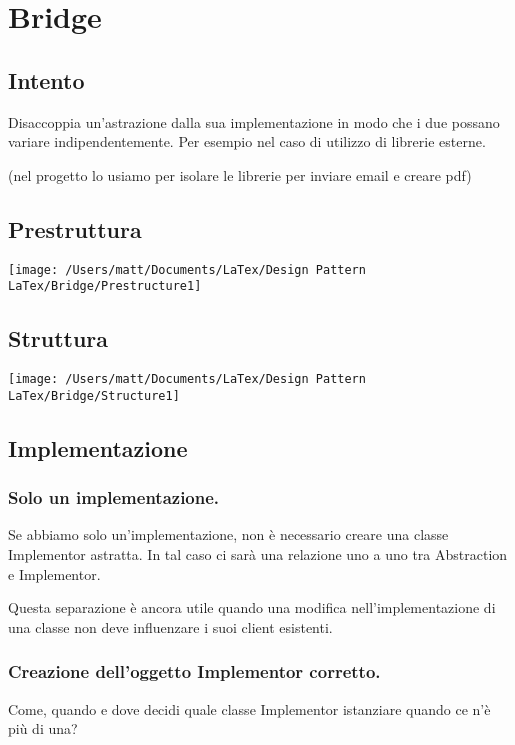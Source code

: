 \chapter{Bridge}
\section{Intento}

Disaccoppia un'astrazione dalla sua implementazione in modo che i due possano variare indipendentemente. Per esempio nel caso di utilizzo di librerie esterne.

(nel progetto lo usiamo per isolare le librerie per inviare email e creare pdf)


\section{Prestruttura}

\texttt{[image: /Users/matt/Documents/LaTex/Design Pattern LaTex/Bridge/Prestructure1]}


\section{Struttura}

\texttt{[image: /Users/matt/Documents/LaTex/Design Pattern LaTex/Bridge/Structure1]}


\section{Implementazione}

\subsection{Solo un implementazione.}
Se abbiamo solo un'implementazione, non è necessario creare una classe Implementor astratta. In tal caso ci sarà una relazione uno a uno tra Abstraction e Implementor.

Questa separazione è ancora utile quando una modifica nell'implementazione di una classe non deve influenzare i suoi client esistenti.

\subsection{Creazione dell'oggetto Implementor corretto.}
Come, quando e dove decidi quale classe Implementor istanziare quando ce n'è più di una?


